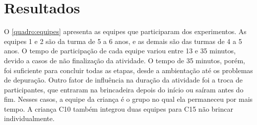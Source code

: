 \chapter{Resultados}
\label{c_resultados}


O \autoref{quadro:equipes} apresenta as equipes que participaram dos experimentos. As equipes 1 e 2 são da turma de 5 a 6 anos, e as demais são das turmas de 4 a 5 anos. O tempo de participação de cada equipe variou entre 13 e 35 minutos, devido a casos de não finalização da atividade. O tempo de 35 minutos, porém, foi suficiente para concluir todas as etapas, desde a ambientação até os problemas de depuração. Outro fator de influência na duração da atividade foi a troca de participantes, que entraram na brincadeira depois do início ou saíram antes do fim. Nesses casos, a equipe da criança é o grupo no qual ela permaneceu por mais tempo. A criança C10 também integrou duas equipes para C15 não brincar individualmente.


